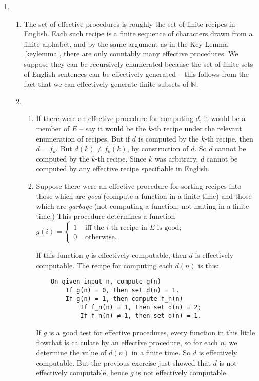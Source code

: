 {\begin{enumerate}
\begin{enumerate}
\begin{itemize}
		\item  $G\widetilde{D}$ contains elements only from $\widetilde{\Delta}$. Then every structure makes some member of $\Delta$ true whose negation is in $G\widetilde{D}$. Let $\Psi$ be the disjunction of negations of every sentence in $G\widetilde{D}$; this is a finite tautologous disjunction. Let $\Phi$ be an arbitrary finite conjunction of members from $\Gamma$. Since $\Psi$ is a tautology, $\Phi\vDash \Psi$.
	\end{itemize}
\end{enumerate}
\item \begin{enumerate}
	\item The set of effective procedures is roughly the set of finite recipes in English. Each such recipe is a finite sequence of characters drawn from a finite alphabet, and by the same argument as in the Key Lemma \ref{keylemma}, there are only countably many effective procedures. We suppose they can be recursively enumerated because the set of finite sets of English sentences can be effectively generated – this follows from the fact that we can effectively generate finite subsets of $\mathbb{N}$.
	\item \begin{enumerate}
		\item If there were an effective procedure for computing $d$, it would be a member of $E$ – say it would be the $k$-th recipe under the relevant enumeration of recipes. But if $d$ is computed by the $k$-th recipe, then $d=f_{k}$. But $d(k) ≠ f_{k}(k)$, by construction of $d$. So $d$ cannot be computed by the $k$-th recipe. Since $k$ was arbitrary, $d$ cannot be computed by any effective recipe specifiable in English.
		\item Suppose there were an effective procedure for sorting recipes into those which are \emph{good} (compute a function in a finite time) and those which are \emph{garbage} (not computing a function, not halting in a finite time.) This procedure determines a function $g(i) = \begin{cases}
			1 &\text{ iff the $i$-th recipe in $E$ is good;}\\
			0 &\text{ otherwise}.
		\end{cases}$ 

If this function $g$ is effectively computable, then $d$ is effectively computable. The recipe for computing each $d(n)$ is this: \begin{verbatim}
    On given input n, compute g(n) 
        If g(n) = 0, then set d(n) = 1. 
        If g(n) = 1, then compute f_n(n)
            If f_n(n) = 1, then set d(n) = 2;
            If f_n(n) ≠ 1, then set d(n) = 1.
\end{verbatim} 
If $g$ is a good test for effective procedures, every function in this little flowchat is calculate by an effective procedure, so for each $n$, we determine the value of $d(n)$ in a finite time. So $d$ is effectively computable. But the previous exercise just showed that $d$ is not effectively computable, hence $g$ is not effectively computable.


\end{enumerate}
\end{enumerate}
\end{enumerate}}
